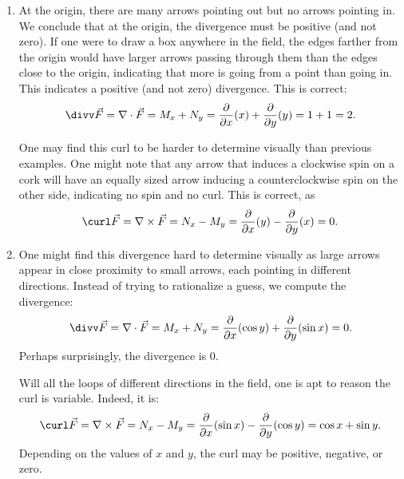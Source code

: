 {\begin{enumerate}
	\item At the origin, there are many arrows pointing out but no arrows pointing in. We conclude that at the origin, the divergence must be positive (and not zero). If one were to draw a box anywhere in the field, the edges farther from the origin would have larger arrows passing through them than the edges close to the origin, indicating that more is going from a point than going in. This indicates a positive (and not zero) divergence. This is correct:
	$$\divv\vec F = \nabla \cdot \vec F = M_x + N_y = \frac{\partial}{\partial x}(x) + \frac{\partial}{\partial y}(y) = 1+1=2.$$
	
	One may find this curl to be harder to determine visually than previous examples. One might note that any arrow that induces a clockwise spin on a cork will have an equally sized arrow inducing a counterclockwise spin on the other side, indicating no spin and no curl. This is correct, as
	$$\curl \vec F = \nabla\times\vec F = N_x-M_y = \frac{\partial}{\partial x}(y) - \frac{\partial}{\partial y}(x) = 0.$$
	
	\item	One might find this divergence hard to determine visually as large arrows appear in close proximity to small arrows, each pointing in different directions. Instead of trying to rationalize a guess, we compute the divergence:
	$$\divv\vec F = \nabla \cdot \vec F = M_x + N_y = \frac{\partial}{\partial x}(\cos y) + \frac{\partial}{\partial y}(\sin x) = 0.$$ 
	Perhaps surprisingly, the divergence is 0.
	
	Will all the loops of different directions in the field, one is apt to reason the curl is variable. Indeed, it is:
	$$\curl \vec F = \nabla\times\vec F = N_x-M_y = \frac{\partial}{\partial x}(\sin x) - \frac{\partial}{\partial y}(\cos y) = \cos x + \sin y.$$
	Depending on the values of $x$ and $y$, the curl may be positive, negative, or zero.
\end{enumerate}
\baselineskip
}\clearpage

